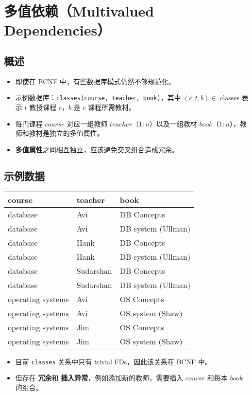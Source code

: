\section{多值依赖（Multivalued Dependencies）}

\subsection{概述}

\begin{itemize}
    \item 即使在 BCNF 中，有些数据库模式仍然不够规范化。
    \item 示例数据库：\texttt{classes(course, teacher, book)}，其中 $(c, t, b) \in$ classes 表示 $t$ 教授课程 $c$，$b$ 是 $c$ 课程所需教材。
    \item 每门课程 $course$ 对应一组教师 $teacher$（$1:n$）以及一组教材 $book$（$1:n$），教师和教材是独立的多值属性。
    \item \textbf{多值属性}之间相互独立，应该避免交叉组合造成冗余。
\end{itemize}

\subsection{示例数据}

\begin{center}
\begin{tabular}{|l|l|l|}
\hline
\textbf{course} & \textbf{teacher} & \textbf{book} \\
\hline
database & Avi & DB Concepts \\
database & Avi & DB system (Ullman) \\
database & Hank & DB Concepts \\
database & Hank & DB system (Ullman) \\
database & Sudarshan & DB Concepts \\
database & Sudarshan & DB system (Ullman) \\
operating systems & Avi & OS Concepts \\
operating systems & Avi & OS system (Shaw) \\
operating systems & Jim & OS Concepts \\
operating systems & Jim & OS system (Shaw) \\
\hline
\end{tabular}
\end{center}

\begin{itemize}
    \item 目前 \texttt{classes} 关系中只有 trivial FDs，因此该关系在 BCNF 中。
    \item 但存在 \textbf{冗余}和 \textbf{插入异常}，例如添加新的教师，需要插入 $course$ 和每本 $book$ 的组合。
\end{itemize}

